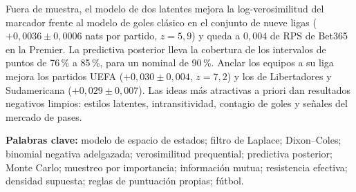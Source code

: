 Fuera de muestra, el modelo de dos latentes mejora la log-verosimilitud del marcador frente al modelo de goles clásico en el conjunto de nueve ligas ($+0{,}0036\pm0{,}0006$ nats por partido, $z=5{,}9$) y queda a $0{,}004$ de RPS de Bet365 en la Premier. La predictiva posterior lleva la cobertura de los intervalos de puntos de 76\,\% a 85\,\%, para un nominal de 90\,\%. Anclar los equipos a su liga mejora los partidos UEFA ($+0{,}030\pm0{,}004$, $z=7{,}2$) y los de Libertadores y Sudamericana ($+0{,}029\pm0{,}007$). Las ideas más atractivas a priori dan resultados negativos limpios: estilos latentes, intransitividad, contagio de goles y señales del mercado de pases.

\vspace{0.4em}
\textsf{\bfseries\small\color{cdpurple}Palabras clave:} modelo de espacio de estados; filtro de Laplace; Dixon–Coles; binomial negativa adelgazada; verosimilitud prequential; predictiva posterior; Monte Carlo; muestreo por importancia; información mutua; resistencia efectiva; densidad supuesta; reglas de puntuación propias; fútbol.
